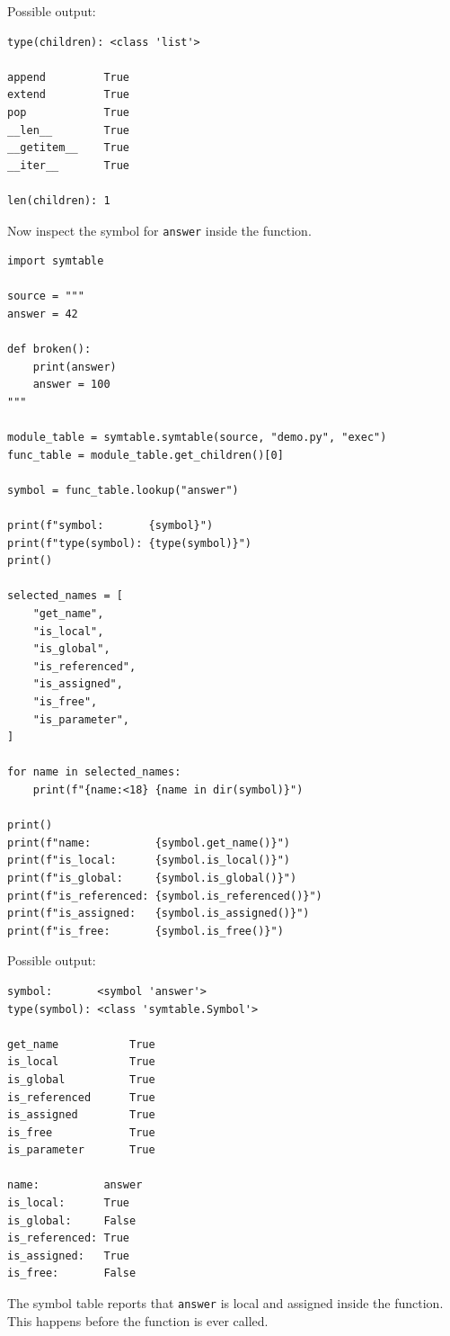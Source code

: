 Possible output:

\begin{verbatim}
type(children): <class 'list'>

append         True
extend         True
pop            True
__len__        True
__getitem__    True
__iter__       True

len(children): 1
\end{verbatim}

Now inspect the symbol for \texttt{answer} inside the function.

\begin{verbatim}
import symtable

source = """
answer = 42

def broken():
    print(answer)
    answer = 100
"""

module_table = symtable.symtable(source, "demo.py", "exec")
func_table = module_table.get_children()[0]

symbol = func_table.lookup("answer")

print(f"symbol:       {symbol}")
print(f"type(symbol): {type(symbol)}")
print()

selected_names = [
    "get_name",
    "is_local",
    "is_global",
    "is_referenced",
    "is_assigned",
    "is_free",
    "is_parameter",
]

for name in selected_names:
    print(f"{name:<18} {name in dir(symbol)}")

print()
print(f"name:          {symbol.get_name()}")
print(f"is_local:      {symbol.is_local()}")
print(f"is_global:     {symbol.is_global()}")
print(f"is_referenced: {symbol.is_referenced()}")
print(f"is_assigned:   {symbol.is_assigned()}")
print(f"is_free:       {symbol.is_free()}")
\end{verbatim}

Possible output:

\begin{verbatim}
symbol:       <symbol 'answer'>
type(symbol): <class 'symtable.Symbol'>

get_name           True
is_local           True
is_global          True
is_referenced      True
is_assigned        True
is_free            True
is_parameter       True

name:          answer
is_local:      True
is_global:     False
is_referenced: True
is_assigned:   True
is_free:       False
\end{verbatim}

The symbol table reports that \texttt{answer} is local and assigned inside the function. This happens before the function is ever called.


